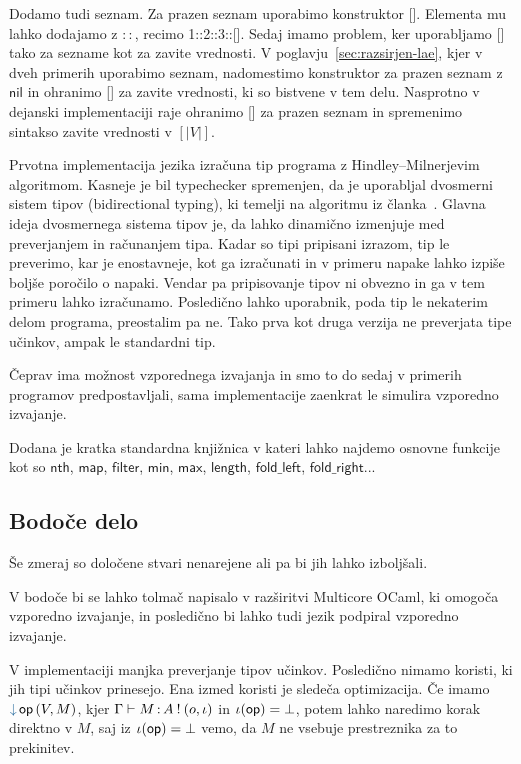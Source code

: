 Dodamo tudi seznam. Za prazen seznam uporabimo konstruktor []. Elementa mu lahko dodajamo z $::$, recimo 1::2::3::[].
Sedaj imamo problem, ker uporabljamo [] tako za sezname kot za zavite vrednosti.
V poglavju~\ref{sec:razsirjen-lae}, kjer v dveh primerih uporabimo seznam, nadomestimo konstruktor za prazen seznam z $\mathsf{nil}$ in ohranimo [] za zavite vrednosti, ki so bistvene v tem delu.
Nasprotno v dejanski implementaciji \aeff{} raje ohranimo [] za prazen seznam in spremenimo sintakso zavite vrednosti v $[|V|]$. 

Prvotna implementacija jezika \aeff{} izračuna tip programa z Hindley–Milnerjevim algoritmom. 
Kasneje je bil typechecker spremenjen, da je uporabljal dvosmerni sistem tipov (bidirectional typing), ki temelji na algoritmu iz članka~\cite{bidirectional}.
Glavna ideja dvosmernega sistema tipov je, da lahko dinamično izmenjuje med preverjanjem in računanjem tipa. Kadar so tipi pripisani izrazom, tip le preverimo, kar je enostavneje, kot ga izračunati in v primeru napake lahko izpiše boljše poročilo o napaki. Vendar pa pripisovanje tipov ni obvezno in ga v tem primeru lahko izračunamo. Posledično lahko uporabnik, poda tip le nekaterim delom programa, preostalim pa ne.
Tako prva kot druga verzija ne preverjata tipe učinkov, ampak le standardni tip.

Čeprav ima \aeff{} možnost vzporednega izvajanja in smo to do sedaj v primerih programov predpostavljali, sama implementacije zaenkrat le simulira vzporedno izvajanje.

Dodana je kratka standardna knjižnica v kateri lahko najdemo osnovne funkcije kot so $\mathsf{nth}$, $\mathsf{map}$, $\mathsf{filter}$, $\mathsf{min}$, $\mathsf{max}$, $\mathsf{length}$, $\mathsf{fold\_left}$, $\mathsf{fold\_right}$...

\subsection{Bodoče delo}

Še zmeraj so določene stvari nenarejene ali pa bi jih lahko izboljšali.

V bodoče bi se lahko tolmač napisalo v razširitvi Multicore OCaml, ki omogoča vzporedno izvajanje, in posledično bi lahko tudi jezik \aeff{} podpiral vzporedno izvajanje. 

V implementaciji manjka preverjanje tipov učinkov. Posledično nimamo koristi, ki jih tipi učinkov prinesejo. Ena izmed koristi je sledeča optimizacija. Če imamo $\tmopin{op}{V}{M}$, kjer $\Gamma \vdash M \mathinner{:} A \mathbin{!} (o, \iota)$ in $\iota(\mathsf{op}) = \bot$, potem lahko naredimo korak direktno v $M$, saj iz $\iota(\mathsf{op}) = \bot$ vemo, da $M$ ne vsebuje prestreznika za to prekinitev. 

